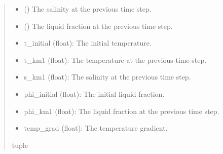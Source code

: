 \documentclass[a4paper,11pt,english,openany]{sphinxmanual}
\begin{document}
\begin{fulllineitems}
\begin{fulllineitems}
\begin{quote}
\begin{description}
\begin{itemize}
\item {} 
\sphinxAtStartPar
{} () \textendash{} The salinity at the previous time step.

\item {} 
\sphinxAtStartPar
{} () \textendash{} The liquid fraction at the previous time step.

\end{itemize}

\sphinxAtStartPar
\begin{description}
\begin{itemize}
\item {} 
\sphinxAtStartPar
t\_initial (float): The initial temperature.

\item {} 
\sphinxAtStartPar
t\_km1 (float): The temperature at the previous time step.

\item {} 
\sphinxAtStartPar
s\_km1 (float): The salinity at the previous time step.

\item {} 
\sphinxAtStartPar
phi\_initial (float): The initial liquid fraction.

\item {} 
\sphinxAtStartPar
phi\_km1 (float): The liquid fraction at the previous time step.

\item {} 
\sphinxAtStartPar
temp\_grad (float): The temperature gradient.

\end{itemize}

\end{description}


\sphinxAtStartPar
tuple

\end{description}\end{quote}

\end{fulllineitems}



\end{fulllineitems}
\end{document}
